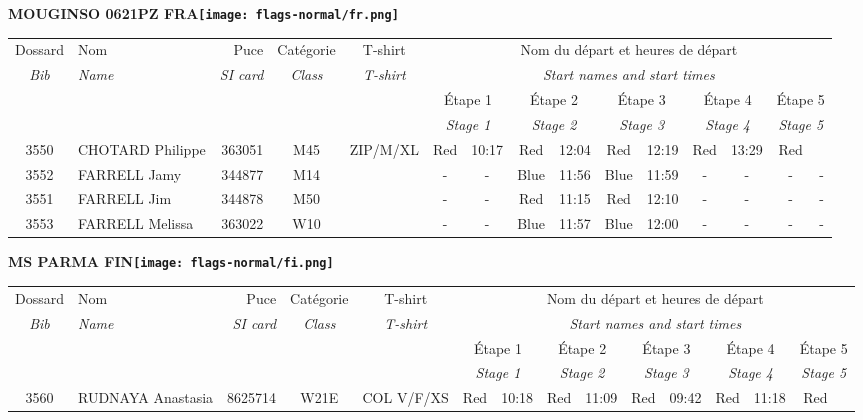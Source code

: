 \documentclass{report}
\begin{document}
\newpage
  \Huge \centering \bfseries MOUGINSO 0621PZ FRA\normalfont \footnotesize \sffamily \hfill \texttt{[image: flags-normal/fr.png]} \newline 
  \begin{longtable}{|c|l|r|c|c|*{5}{cc|}}
    Dossard & Nom  & Puce    & Catégorie & T-shirt & \multicolumn{10}{c|}{Nom du départ et heures de départ} \\
    \itshape Bib     & \itshape Name & \itshape SI card & \itshape Class  & \itshape  T-shirt  & \multicolumn{10}{c|}{\itshape Start names and start times} \\
    \hline
    & & & & & \multicolumn{2}{c|}{Étape 1} & \multicolumn{2}{c|}{Étape 2} & \multicolumn{2}{c|}{Étape 3} & \multicolumn{2}{c|}{Étape 4} & \multicolumn{2}{c|}{Étape 5} \\
    & & & & & \multicolumn{2}{c|}{\itshape Stage 1} & \multicolumn{2}{c|}{\itshape Stage 2} & \multicolumn{2}{c|}{\itshape Stage 3} & \multicolumn{2}{c|}{\itshape Stage 4} & \multicolumn{2}{c|}{\itshape Stage 5} \\
    \hline
    3550 & CHOTARD Philippe & 363051 & M45 & ZIP/M/XL & Red & 10:17 & Red & 12:04 & Red & 12:19 & Red & 13:29 & Red &  \\
    3552 & FARRELL Jamy & 344877 & M14 &   & - &  - & Blue & 11:56 & Blue & 11:59 & - &  - & - &  -\\
    3551 & FARRELL Jim & 344878 & M50 &   & - &  - & Red & 11:15 & Red & 12:10 & - &  - & - &  -\\
    3553 & FARRELL Melissa & 363022 & W10 &   & - &  - & Blue & 11:57 & Blue & 12:00 & - &  - & - &  -\\
  \end{longtable}
\newpage
  \Huge \centering \bfseries MS PARMA  FIN\normalfont \footnotesize \sffamily \hfill \texttt{[image: flags-normal/fi.png]} \newline 
  \begin{longtable}{|c|l|r|c|c|*{5}{cc|}}
    Dossard & Nom  & Puce    & Catégorie & T-shirt & \multicolumn{10}{c|}{Nom du départ et heures de départ} \\
    \itshape Bib     & \itshape Name & \itshape SI card & \itshape Class  & \itshape  T-shirt  & \multicolumn{10}{c|}{\itshape Start names and start times} \\
    \hline
    & & & & & \multicolumn{2}{c|}{Étape 1} & \multicolumn{2}{c|}{Étape 2} & \multicolumn{2}{c|}{Étape 3} & \multicolumn{2}{c|}{Étape 4} & \multicolumn{2}{c|}{Étape 5} \\
    & & & & & \multicolumn{2}{c|}{\itshape Stage 1} & \multicolumn{2}{c|}{\itshape Stage 2} & \multicolumn{2}{c|}{\itshape Stage 3} & \multicolumn{2}{c|}{\itshape Stage 4} & \multicolumn{2}{c|}{\itshape Stage 5} \\
    \hline
    3560 & RUDNAYA Anastasia & 8625714 & W21E & COL V/F/XS & Red & 10:18 & Red & 11:09 & Red & 09:42 & Red & 11:18 & Red &  \\
  \end{longtable}
\end{document}
